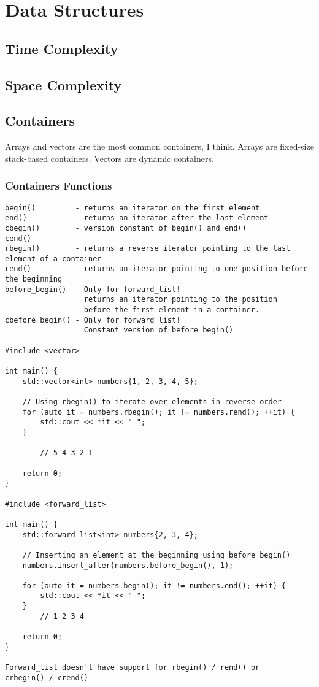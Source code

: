

\chapter{Data Structures}


\section{Time Complexity}

\section{Space Complexity}



\section{Containers}

Arrays and vectors are the most common containers, I think. Arrays are fixed-size stack-based containers. Vectors
are dynamic containers.

\subsection{Containers Functions}

\begin{verbatim}
begin()         - returns an iterator on the first element 
end()           - returns an iterator after the last element
cbegin()        - version constant of begin() and end()
cend()  
rbegin()        - returns a reverse iterator pointing to the last element of a container
rend()          - returns an iterator pointing to one position before the beginning
before_begin()  - Only for forward_list! 
                  returns an iterator pointing to the position
                  before the first element in a container.  
cbefore_begin() - Only for forward_list!
                  Constant version of before_begin()

#include <vector>

int main() {
    std::vector<int> numbers{1, 2, 3, 4, 5};

    // Using rbegin() to iterate over elements in reverse order
    for (auto it = numbers.rbegin(); it != numbers.rend(); ++it) {
        std::cout << *it << " ";
    }

        // 5 4 3 2 1

    return 0;
}

#include <forward_list>

int main() {
    std::forward_list<int> numbers{2, 3, 4};

    // Inserting an element at the beginning using before_begin()
    numbers.insert_after(numbers.before_begin(), 1);

    for (auto it = numbers.begin(); it != numbers.end(); ++it) {
        std::cout << *it << " ";
    }
        // 1 2 3 4

    return 0;
}

Forward_list doesn't have support for rbegin() / rend() or
crbegin() / crend()
\end{verbatim}

